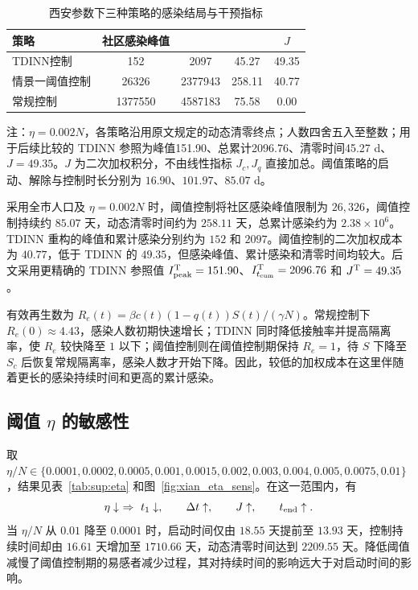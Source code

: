 \documentclass[lang=cn,a4paper,newtx]{elegantpaper}
\numberwithin{equation}{section}
\theoremstyle{plain}
\renewcommand{\arraystretch}{1.12}
\newcommand{\Itcum}{I_{t_{\mathrm{cum}}}}
\begin{document}
\begin{table}[htbp]
\centering\small
\setlength{\tabcolsep}{3.5pt}
\renewcommand{\arraystretch}{1.25}
\begin{threeparttable}
\caption{西安参数下三种策略的感染结局与干预指标}
\label{tab:xian_summary}
\begin{tabular*}{\linewidth}{@{\extracolsep{\fill}}lS[table-format=7.0]S[table-format=7.0]S[table-format=3.2]S[table-format=2.2]@{}}
\toprule
策略 & {社区感染峰值} & {} & {} & {$J$}\\
\midrule
TDINN控制 & 152 & 2097 & 45.27 & 49.35\\
情景一阈值控制 & 26326 & 2377943 & 258.11 & 40.77\\
常规控制 & 1377550 & 4587183 & 75.58 & 0.00\\
\bottomrule
\end{tabular*}
\begin{tablenotes}[flushleft]\footnotesize
\item 注：$\eta=0.002N$，各策略沿用原文规定的动态清零终点；人数四舍五入至整数；用于后续比较的 TDINN 参照为峰值151.90、总累计2096.76、清零时间45.27 d、$J=49.35$。$J$ 为二次加权积分，不由线性指标 $J_c,J_q$ 直接加总。阈值策略的启动、解除与控制时长分别为 $16.90$、$101.97$、$85.07$ d。
\end{tablenotes}
\end{threeparttable}
\end{table}


采用全市人口及 $\eta=0.002N$ 时，阈值控制将社区感染峰值限制为 $26{,}326$，阈值控制持续约 $85.07$ 天，动态清零时间约为 $258.11$ 天，总累计感染约为 $2.38\times10^6$。TDINN 重构的峰值和累计感染分别约为 $152$ 和 $2097$。阈值控制的二次加权成本为 $40.77$，低于 TDINN 的 $49.35$，但感染峰值、累计感染和清零时间均较大。后文采用更精确的 TDINN 参照值 $I_{\rm peak}^{\rm T}=151.90$、$\Itcum^{\rm T}=2096.76$ 和 $J^{\rm T}=49.35$。

有效再生数为 $R_e(t)=\beta c(t)(1-q(t))S(t)/(\gamma N)$。常规控制下 $R_e(0)\approx4.43$，感染人数初期快速增长；TDINN 同时降低接触率并提高隔离率，使 $R_e$ 较快降至 $1$ 以下；阈值控制则在阈值控制期保持 $R_e=1$，待 $S$ 下降至 $S_c$ 后恢复常规隔离率，感染人数才开始下降。因此，较低的加权成本在这里伴随着更长的感染持续时间和更高的累计感染。

\subsection{阈值 \texorpdfstring{$\eta$}{eta} 的敏感性}
取 $\eta/N\in\{0.0001,0.0002,0.0005,0.001,0.0015,0.002,0.003,0.004,0.005,0.0075,0.01\}$，结果见表~\ref{tab:sup:eta} 和图~\ref{fig:xian_eta_sens}。在这一范围内，有
\[
\eta\downarrow\ \Rightarrow\ t_1\downarrow,\qquad \Delta t\uparrow,\qquad J\uparrow,\qquad t_{\rm end}\uparrow.
\]
当 $\eta/N$ 从 $0.01$ 降至 $0.0001$ 时，启动时间仅由 $18.55$ 天提前至 $13.93$ 天，控制持续时间却由 $16.61$ 天增加至 $1710.66$ 天，动态清零时间达到 $2209.55$ 天。降低阈值减慢了阈值控制期的易感者减少过程，其对持续时间的影响远大于对启动时间的影响。
\end{document}
